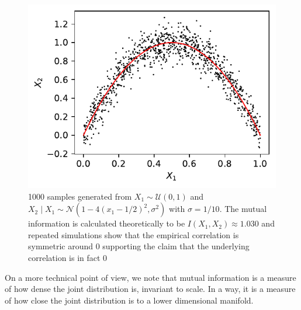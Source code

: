 \documentclass[../Thesis.tex]{subfiles}
\begin{document}
\begin{figure}[h]
    \centering
    \includegraphics[width=.55\linewidth]{figures/Mutual information figures/parabola example.pdf}
    \caption{1000 samples generated from $X_1\sim \mathcal{U}\left(0,1\right)$ and $X_2 \mid X_1 \sim \mathcal{N}\left(1 - 4\left(x_1 - 1/2\right)^2 , \sigma^2\right)$ with $\sigma = 1/10$. The mutual information is calculated theoretically to be $I\left(X_1,X_2\right) \approx 1.030$ and repeated simulations show that the empirical correlation is symmetric around $0$ supporting the claim that the underlying correlation is in fact $0$} %
    \label{fig:MI parabola example}
\end{figure}
On a more technical point of view, we note that mutual information is a measure of how dense the joint distribution is, invariant to scale. In a way, it is a measure of how close the joint distribution is to a lower dimensional manifold.
\end{document}

